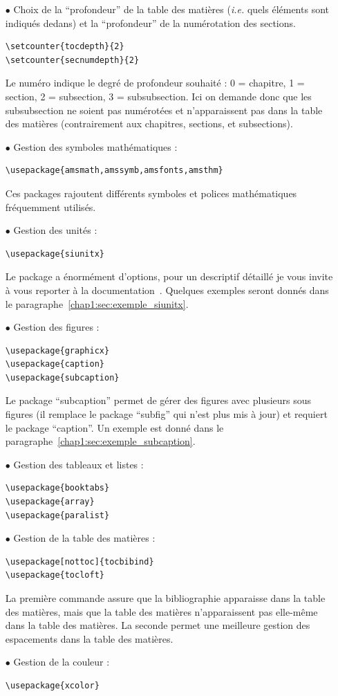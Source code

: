 \begin{itemize}
\item[$\bullet$] Choix de la ``profondeur'' de la table des matières (\textit{i.e.} quels éléments sont indiqués dedans) et la ``profondeur'' de la numérotation des sections.
\begin{verbatim}
\setcounter{tocdepth}{2} 
\setcounter{secnumdepth}{2}
\end{verbatim}
Le numéro indique le degré de profondeur souhaité : 0 = chapitre, 1 = section, 2 = subsection, 3 = subsubsection. Ici on demande donc que les subsubsection ne soient pas numérotées et n'apparaissent pas dans la table des matières (contrairement aux chapitres, sections, et subsections).
\item[$\bullet$] Gestion des symboles mathématiques :
\begin{verbatim}
\usepackage{amsmath,amssymb,amsfonts,amsthm}
\end{verbatim}
Ces packages rajoutent différents symboles et polices mathématiques fréquemment utilisés.
\item[$\bullet$] Gestion des unités :
\begin{verbatim}
\usepackage{siunitx}
\end{verbatim}
Le package a énormément d'options, pour un descriptif détaillé je vous invite à vous reporter à la documentation~\cite{siunitx}. Quelques exemples seront donnés dans le paragraphe~\ref{chap1:sec:exemple_siunitx}.
\item[$\bullet$] Gestion des figures :
\begin{verbatim}
\usepackage{graphicx}
\usepackage{caption}
\usepackage{subcaption}
\end{verbatim}
Le package ``subcaption'' permet de gérer des figures avec plusieurs sous figures (il remplace le package ``subfig'' qui n'est plus mis à jour) et requiert le package ``caption''. Un exemple est donné dans le paragraphe~\ref{chap1:sec:exemple_subcaption}.
\item[$\bullet$] Gestion des tableaux et listes :
\begin{verbatim}
\usepackage{booktabs}
\usepackage{array}
\usepackage{paralist}
\end{verbatim}
\item[$\bullet$] Gestion de la table des matières :
\begin{verbatim}
\usepackage[nottoc]{tocbibind}
\usepackage{tocloft}
\end{verbatim}
La première commande assure que la bibliographie apparaisse dans la table des matières, mais que la table des matières n'apparaissent pas elle-même dans la table des matières. La seconde permet une meilleure gestion des espacements dans la table des matières.
\item[$\bullet$] Gestion de la couleur :
\begin{verbatim}
\usepackage{xcolor}
\end{verbatim}
\end{itemize}

